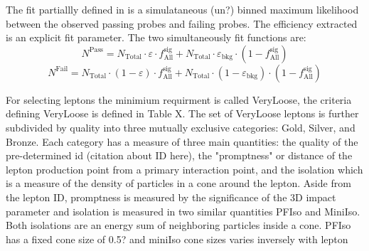 The fit partiallly defined in \cite{Berryhill_2010} is a simulataneous (un?) binned maximum likelihood between the observed passing probes and failing probes. The efficiency extracted is an explicit fit parameter. The two simultaneously fit functions are:
\begin{equation}
	N^{\text{Pass}} = N_{\text{Total}} \cdot \varepsilon \cdot f^{\text{sig}}_{\text{All}} + N_{\text{Total}}  \cdot \varepsilon_{\text{bkg}} \cdot (1-f^{\text{sig}}_{\text{All}})
\end{equation} 
\begin{equation}
	N^{\text{Fail}} = N_{\text{Total}} \cdot (1-\varepsilon) \cdot f^{\text{sig}}_{\text{All}} + N_{\text{Total}}  \cdot (1-\varepsilon_{\text{bkg}}) \cdot (1-f^{\text{sig}}_{\text{All}})
\end{equation}



For selecting leptons the minimium requirment is called VeryLoose, the criteria defining VeryLoose is defined in Table X.  The set of VeryLoose leptons is further subdivided by quality into three mutually exclusive categories: Gold, Silver, and Bronze. Each category has a measure of three main quantities: the quality of the pre-determined id (citation about ID here), the "promptness" or distance of the lepton production point from a primary interaction point, and the isolation which is a measure of the density of particles in a cone around the lepton.  Aside from the lepton ID, promptness is measured by the significance of the 3D impact parameter and isolation is measured in two similar quantities PFIso and MiniIso. Both isolations are an energy sum of neighboring particles inside a cone. PFIso has a fixed cone size of 0.5? and miniIso cone sizes varies inversely with lepton \pt

